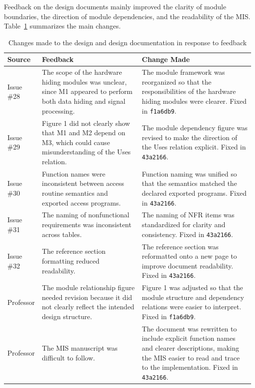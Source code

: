 \documentclass{article}
\begin{document}
Feedback on the design documents mainly improved the clarity of module boundaries, the direction of module dependencies, and the readability of the MIS.
Table~\ref{tab:design-feedback} summarizes the main changes.

\begin{table}[H]
\centering
\footnotesize
\renewcommand{\arraystretch}{1.05}
\caption{Changes made to the design and design documentation in response to feedback}
\label{tab:design-feedback}
\begin{tabularx}{0.96\textwidth}{p{1.8cm} p{4.2cm} X}
\toprule
\textbf{Source} & \textbf{Feedback} & \textbf{Change Made} \\
\midrule

Issue \#28 &
The scope of the hardware hiding modules was unclear, since M1 appeared to perform both data hiding and signal processing. &
The module framework was reorganized so that the responsibilities of the hardware hiding modules were clearer. Fixed in \texttt{f1a6db9}. \\

Issue \#29 &
Figure 1 did not clearly show that M1 and M2 depend on M3, which could cause misunderstanding of the Uses relation. &
The module dependency figure was revised to make the direction of the Uses relation explicit. Fixed in \texttt{43a2166}. \\

Issue \#30 &
Function names were inconsistent between access routine semantics and exported access programs. &
Function naming was unified so that the semantics matched the declared exported programs. Fixed in \texttt{43a2166}. \\

Issue \#31 &
The naming of nonfunctional requirements was inconsistent across tables. &
The naming of NFR items was standardized for clarity and consistency. Fixed in \texttt{43a2166}. \\

Issue \#32 &
The reference section formatting reduced readability. &
The reference section was reformatted onto a new page to improve document readability. Fixed in \texttt{43a2166}. \\

Professor &
The module relationship figure needed revision because it did not clearly reflect the intended design structure. &
Figure 1 was adjusted so that the module structure and dependency relations were easier to interpret. Fixed in \texttt{f1a6db9}. \\

Professor &
The MIS manuscript was difficult to follow. &
The document was rewritten to include explicit function names and clearer descriptions, making the MIS easier to read and trace to the implementation. Fixed in \texttt{43a2166}. \\

\bottomrule
\end{tabularx}
\end{table}
\end{document}
